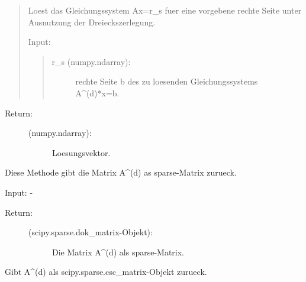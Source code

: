 \documentclass[letterpaper,10pt,ngerman]{sphinxmanual}
\begin{document}
\begin{fulllineitems}
\begin{fulllineitems}
\begin{quote}
Loest das Gleichungssystem Ax=r\_s fuer eine vorgebene rechte Seite unter Ausnutzung der
Dreieckszerlegung.

Input:
\begin{quote}
\begin{description}
\item[{r\_s (numpy.ndarray):}] \leavevmode
rechte Seite b des zu loesenden Gleichungssystems A\textasciicircum{}(d)*x=b.

\end{description}
\end{quote}
\end{quote}
\begin{description}
\item[{Return:}] \leavevmode\begin{description}
\item[{(numpy.ndarray):}] \leavevmode
Loesungsvektor.

\end{description}

\end{description}

\end{fulllineitems}


\begin{fulllineitems}
\label{\detokenize{index:sparse_erw.Sparse.return_mat_d}}
Diese Methode gibt die Matrix A\textasciicircum{}(d) as sparse-Matrix zurueck.

Input: -
\begin{description}
\item[{Return:}] \leavevmode\begin{description}
\item[{(scipy.sparse.dok\_matrix-Objekt):}] \leavevmode
Die Matrix A\textasciicircum{}(d) als sparse-Matrix.

\end{description}

\end{description}

\end{fulllineitems}


\begin{fulllineitems}
\label{\detokenize{index:sparse_erw.Sparse.return_mat_d_csc}}
Gibt A\textasciicircum{}(d) als scipy.sparse.csc\_matrix-Objekt zurueck.


\end{fulllineitems}
\end{fulllineitems}
\end{document}
